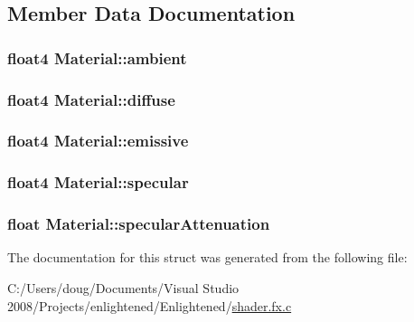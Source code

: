 \subsection{Member Data Documentation}
\hypertarget{struct_material_ae5a78a4bf0b887ac19dc2791462fed0c}{
\subsubsection[{ambient}]{\setlength{\rightskip}{0pt plus 5cm}float4 {\bf Material::ambient}}}
\label{struct_material_ae5a78a4bf0b887ac19dc2791462fed0c}
\hypertarget{struct_material_a1c55452b2bb7f89198793ed123cf2b77}{
\subsubsection[{diffuse}]{\setlength{\rightskip}{0pt plus 5cm}float4 {\bf Material::diffuse}}}
\label{struct_material_a1c55452b2bb7f89198793ed123cf2b77}
\hypertarget{struct_material_aeb6810b6c022a1e7b1d3aeed4822c5d5}{
\subsubsection[{emissive}]{\setlength{\rightskip}{0pt plus 5cm}float4 {\bf Material::emissive}}}
\label{struct_material_aeb6810b6c022a1e7b1d3aeed4822c5d5}
\hypertarget{struct_material_a854d31d1218ac21334f2c5bd7b04bae3}{
\subsubsection[{specular}]{\setlength{\rightskip}{0pt plus 5cm}float4 {\bf Material::specular}}}
\label{struct_material_a854d31d1218ac21334f2c5bd7b04bae3}
\hypertarget{struct_material_a4580ca0557402f1b992cb8156c535343}{
\subsubsection[{specularAttenuation}]{\setlength{\rightskip}{0pt plus 5cm}float {\bf Material::specularAttenuation}}}
\label{struct_material_a4580ca0557402f1b992cb8156c535343}


The documentation for this struct was generated from the following file:\begin{DoxyCompactItemize}
\item 
C:/Users/doug/Documents/Visual Studio 2008/Projects/enlightened/Enlightened/\hyperlink{shader_8fx_8c}{shader.fx.c}\end{DoxyCompactItemize}

